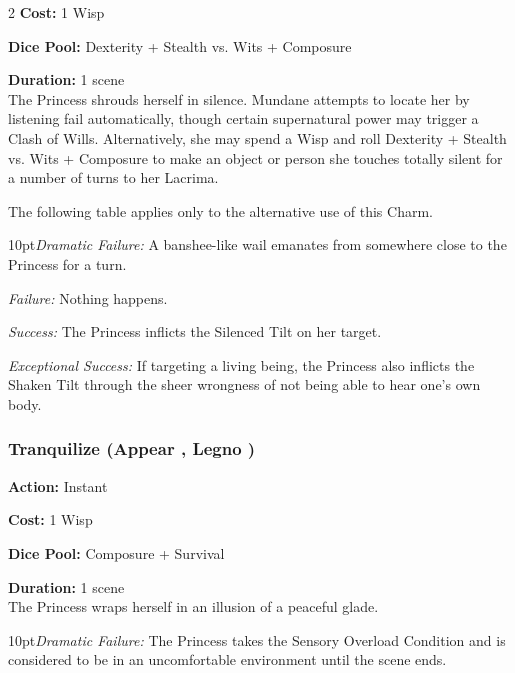 \begin{multicols}{2}
\noindent \textbf{Cost:} 1 Wisp 

\noindent \textbf{Dice Pool:} Dexterity + Stealth vs. Wits + Composure

\noindent \textbf{Duration:} 1 scene \\

\noindent The Princess shrouds herself in silence. Mundane attempts to locate her by listening fail automatically, though certain supernatural power may trigger a Clash of Wills. Alternatively, she may spend a Wisp and roll Dexterity + Stealth vs. Wits + Composure to make an object or person she touches totally silent for a number of turns to her Lacrima. 

The following table applies only to the alternative use of this Charm. 

\begin{myindentpar}{10pt}\emph{Dramatic Failure:} A banshee-like wail emanates from somewhere close to the Princess for a turn.

    \emph{Failure:} Nothing happens. 

    \emph{Success:} The Princess inflicts the Silenced Tilt on her target. 

    \emph{Exceptional Success:} If targeting a living being, the Princess also inflicts the Shaken Tilt through the sheer wrongness of not being able to hear one's own body. \end{myindentpar}

\subsubsection*{Tranquilize (Appear \textbullet, Legno \textbullet )}

\noindent \textbf{Action:} Instant

\noindent \textbf{Cost:} 1 Wisp 

\noindent \textbf{Dice Pool:} Composure + Survival

\noindent \textbf{Duration:} 1 scene \\

\noindent The Princess wraps herself in an illusion of a peaceful glade. 

\begin{myindentpar}{10pt}\emph{Dramatic Failure:} The Princess takes the Sensory Overload Condition and is considered to be in an uncomfortable environment until the scene ends. 


\end{myindentpar}
\end{multicols}
